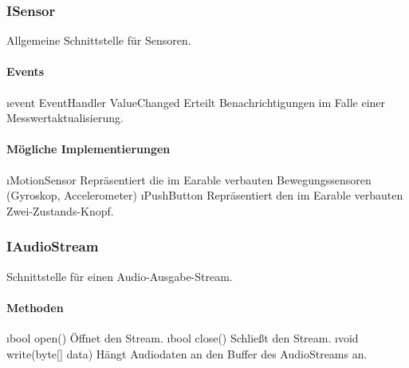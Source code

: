 \documentclass[../entwurf.tex]{subfiles}
\begin{document}
\subsubsection{ISensor}
Allgemeine Schnittstelle für Sensoren.
\paragraph{Events}
\begin{itemize}
	\i{event EventHandler ValueChanged} Erteilt Benachrichtigungen im Falle einer Messwertaktualisierung.
\end{itemize}
\paragraph{Mögliche Implementierungen}
\begin{itemize}
	\i{MotionSensor} Repräsentiert die im Earable verbauten Bewegungssensoren (Gyroskop, Accelerometer)
	\i{PushButton} Repräsentiert den im Earable verbauten Zwei-Zustands-Knopf.
\end{itemize}

\subsubsection{IAudioStream}
Schnittstelle für einen Audio-Ausgabe-Stream.
\paragraph{Methoden}
\begin{itemize}
	\i{bool open()} Öffnet den Stream.
	\i{bool close()} Schließt den Stream.
	\i{void write(byte[] data)} Hängt Audiodaten an den Buffer des AudioStreams an.
\end{itemize}
\end{document}
